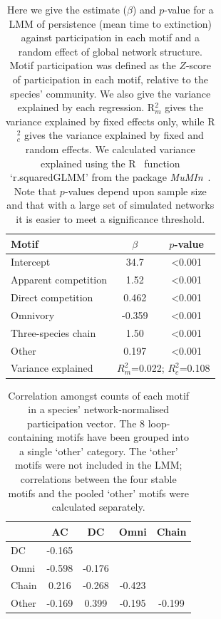 \documentclass[12pt]{article}
\begin{document}
\begin{spacing}{2.0}
		\begin{table}[hb!]
		\caption{Here we give the estimate ($\beta$) and $p$-value for a LMM of persistence (mean time to extinction) against participation in each motif and a random effect of global network structure.  Motif participation was defined as the $Z$-score of participation in each motif, relative to the species' community. We also give the variance explained by each regression. R$^{2}_{m}$ gives the variance explained by fixed effects only, while R$^{2}_{c}$ gives the variance explained by fixed and random effects. We calculated variance explained using the R~\citep{R} function `r.squaredGLMM' from the package \emph{MuMIn}~\citep{MuMIn}. Note that $p$-values depend upon sample size and that with a large set of simulated networks it is easier to meet a significance threshold.}
		\label{tab:persistence_Z}
		\begin{tabular}{l | c c}
		 Motif & $\beta$ & $p$-value \\  
		 \hline
		 Intercept & 34.7 & \textless0.001 \\
		 \hline
		 Apparent competition & 1.52 & \textless0.001 \\
		 Direct competition &  0.462  & \textless0.001 \\
		 Omnivory & -0.359  & \textless0.001 \\
		 Three-species chain & 1.50 & \textless0.001 \\
		 Other &  0.197  & \textless0.001 \\
		 \hline
		 Variance explained & \multicolumn{2}{c}{$R^{2}_m$=0.022; $R^{2}_c$=0.108} \\
		 \hline
		 \end{tabular}
		 \end{table}


		\begin{table}[hb!]
		\caption{Correlation amongst counts of each motif in a species' network-normalised participation vector. The 8 loop-containing motifs have been grouped into a single `other' category. The `other' motifs were not included in the LMM; correlations between the four stable motifs and the pooled `other' motifs were calculated separately.}
		\label{tab:Z_correlations}
		\begin{tabular}{l | c c c c}
			& AC & DC & Omni & Chain \\
		\hline
		DC     & -0.165 &        &        &    \\
		Omni   & -0.598 & -0.176 &        &     \\
		Chain  &  0.216 & -0.268 & -0.423 &      \\
		Other  & -0.169 &  0.399 & -0.195 & -0.199 \\
		\hline
		\end{tabular}
		\end{table}



\end{spacing}
\end{document}
